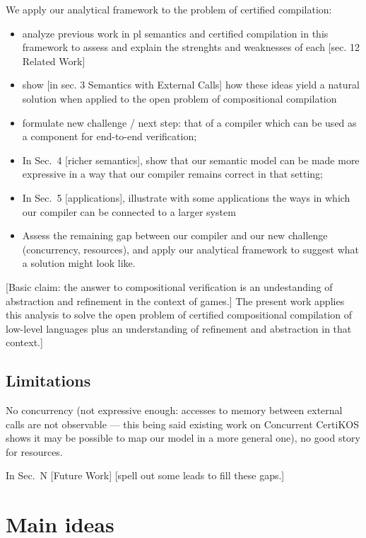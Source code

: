 \documentclass[acmsmall,10pt,review,anonymous]{acmart}
\begin{document}
{We apply our analytical framework to the problem of certified compilation:
\begin{itemize}
\item analyze previous work in pl semantics and certified compilation
  in this framework to assess and explain the strenghts and weaknesses of each
  [sec. 12 Related Work]
\item show [in sec. 3 Semantics with External Calls]
  how these ideas yield a natural solution
  when applied to the open problem of compositional compilation
\item formulate new challenge / next step:
  that of a compiler which can be used as a component
  for end-to-end verification;
\item In Sec.~4 [richer semantics],
  show that our semantic model can be made more expressive
  in a way that our compiler remains correct in that setting;
\item In Sec.~5 [applications],
  illustrate with some applications
  the ways in which our compiler can be connected
  to a larger system
\item Assess the remaining gap between our compiler
  and our new challenge (concurrency, resources),
  and apply our analytical framework to suggest
  what a solution might look like.
\end{itemize}

[Basic claim: the answer to compositional verification
is an undestanding of abstraction and refinement in the context of games.]
The present work applies this analysis to
solve the open problem of certified compositional compilation of low-level languages
plus an understanding of refinement and abstraction in that context.]

\subsection{Limitations}

No concurrency
(not expressive enough:
accesses to memory between external calls are not observable
--- this being said existing work on Concurrent CertiKOS shows
it may be possible to map our model in a more general one),
no good story for resources.

In Sec.~N [Future Work] [spell out some leads to fill these gaps.]

} %


\section{Main ideas} %
\end{document}
